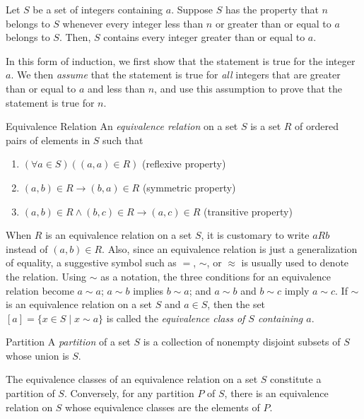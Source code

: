 \documentclass[../butidigress.tex]{subfiles}
\begin{document}
\begin{theorem}
Let $S$ be a set of integers containing $a$.
Suppose $S$ has the property that $n$ belongs to $S$ whenever every integer less than $n$ or greater than or equal to $a$ belongs to $S$.
Then, $S$ contains every integer greater than or equal to $a$.
\end{theorem}

In this form of induction, we first show that the statement is true for the integer $a$.
We then \emph{assume} that the statement is true for \emph{all} integers that are greater than or equal to $a$ and less than $n$, and use this assumption to prove that the statement is true for $n$.


\begin{definition}{Equivalence Relation}
An \emph{equivalence relation} on a set $S$ is a set $R$ of ordered pairs of elements in $S$ such that
\begin{enumerate}\mathlist
    \item $(\forall a\in S)((a,a) \in R)$ (reflexive property)
    \item $(a,b) \in R \rightarrow (b,a) \in R$ (symmetric property)
    \item $(a,b) \in R \wedge (b,c) \in R \rightarrow (a,c) \in R$ (transitive property)
\end{enumerate}
\end{definition}

When $R$ is an equivalence relation on a set $S$, it is customary to write $aRb$ instead of $(a,b) \in R$.
Also, since an equivalence relation is just a generalization of equality, a suggestive symbol such as $=$, $\sim$, or $\approx$ is usually used to denote the relation.
Using $\sim$ as a notation, the three conditions for an equivalence relation become $a\sim a$; $a\sim b$ implies $b\sim a$; and $a\sim b$ and $b\sim c$ imply $a\sim c$.
If $\sim$ is an equivalence relation on a set $S$ and $a \in S$, then the set $[a] = \{ x \in S \mid x\sim a\}$ is called the \emph{equivalence class of $S$ containing $a$}.

\begin{definition}{Partition}
A \emph{partition} of a set $S$ is a collection of nonempty disjoint subsets of $S$ whose union is $S$.
\end{definition}

\begin{theorem}
The equivalence classes of an equivalence relation on a set $S$ constitute a partition of $S$.
Conversely, for any partition $P$ of $S$, there is an equivalence relation on $S$ whose equivalence classes are the elements of $P$.
\end{theorem}
\end{document}
